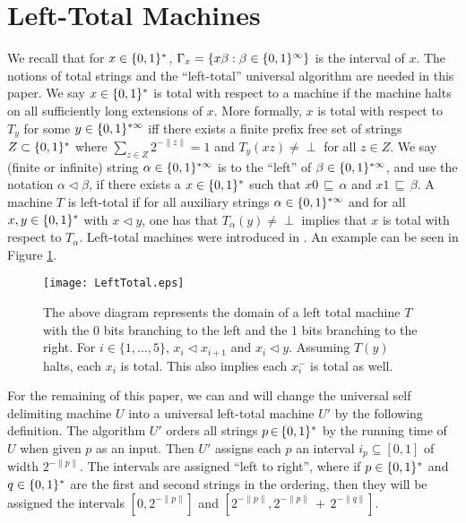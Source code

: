 \documentclass[11pt]{article}\textwidth 6.5in\textheight 9in
\begin{document}
\section{Left-Total Machines}
\label{sec:LeftTotal}
We recall that for $x\in\{0,1\}^*$, $\Gamma_x=\{x\beta:\beta\in\{0,1\}^\infty\}$ is the interval of $x$.
The notions of total strings and the ``left-total'' universal algorithm are needed in this paper. We say $x\in\{0,1\}^*$ is total with respect to a machine if the machine halts on all sufficiently long extensions of $x$. More formally, $x$ is total with respect to $T_y$ for some $y\in\{0,1\}^{*\infty}$ iff there exists a finite prefix free set of strings $Z\subset\{0,1\}^*$ where $\sum_{z\in Z}2^{-\|z\|}=1$ and $T_y(xz)\neq\perp$ for all $z\in Z$.  We say (finite or infinite) string $\alpha\in\{0,1\}^{*\infty}$ is to the ``left'' of $\beta\in\{0,1\}^{*\infty}$, and use the notation $\alpha\lhd \beta$, if there exists a $x\in\{0,1\}^*$ such that $x0\,{\sqsubseteq}\, \alpha$ and $x1\,{\sqsubseteq}\, \beta$. A machine $T$ is left-total if for all auxiliary strings $\alpha\in\{0,1\}^{*\infty}$ and for all $x,y\in\{0,1\}^*$ with $x\lhd y$, one has that $T_\alpha(y)\neq\perp$ implies that $x$ is total with respect to $T_\alpha$. Left-total machines were introduced in \citep{Levin16}. An example can be seen in Figure \ref{fig:LeftTotal}.

\begin{figure}[h!]
	\begin{center}
		\texttt{[image: LeftTotal.eps]}
		\caption{The above diagram represents the domain of a left total machine $T$ with the 0 bits branching to the left and the 1 bits branching to the right. For $i\in \{1,\dots,5\}$, $x_i\lhd x_{i+1}$ and $x_i\lhd y$. Assuming $T(y)$ halts, each $x_i$ is total. This also implies each $x_i^-$ is total as well.}
		\label{fig:LeftTotal}
	\end{center}
\end{figure}

For the remaining of this paper, we can and will change the universal self delimiting machine $U$ into a universal left-total machine $U'$ by the following definition. The algorithm $U'$ orders all strings $p\,{\in}\,\{0,1\}^*$ by the running time of $U$ when given $p$ as an input. Then $U'$ assigns each $p$ an interval $i_p{\subseteq}[0,1]$ of width $2^{-\|p\|}$. The intervals are assigned ``left to right'', where if $p\in\{0,1\}^*$ and $q\in\{0,1\}^*$ are the first and second strings in the ordering, then they will be assigned the intervals $[0,2^{-\|p\|}]$ and $[2^{-\|p\|},2^{-\|p\|}\,{+}\,2^{-\|q\|}]$. 
\end{document}
